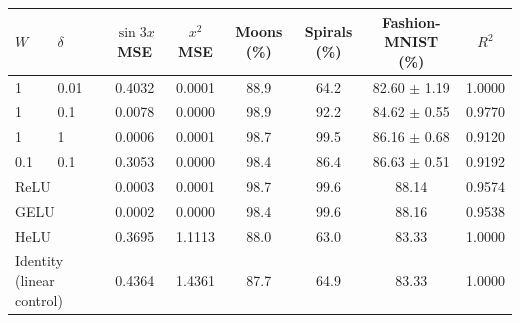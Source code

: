 \begin{tabular}{llcccccc}
\toprule
$W$ & $\delta$ & $\sin 3x$ MSE & $x^2$ MSE & Moons (\%) & Spirals (\%) & Fashion-MNIST (\%) & $R^2$ \\
\midrule
1 & 0.01 & 0.4032 & 0.0001 & 88.9 & 64.2 & 82.60 $\pm$ 1.19 & 1.0000 \\
1 & 0.1 & 0.0078 & 0.0000 & 98.9 & 92.2 & 84.62 $\pm$ 0.55 & 0.9770 \\
1 & 1 & 0.0006 & 0.0001 & 98.7 & 99.5 & 86.16 $\pm$ 0.68 & 0.9120 \\
0.1 & 0.1 & 0.3053 & 0.0000 & 98.4 & 86.4 & 86.63 $\pm$ 0.51 & 0.9192 \\
\midrule
\multicolumn{2}{l}{ReLU} & 0.0003 & 0.0001 & 98.7 & 99.6 & 88.14 & 0.9574 \\
\multicolumn{2}{l}{GELU} & 0.0002 & 0.0000 & 98.4 & 99.6 & 88.16 & 0.9538 \\
\multicolumn{2}{l}{HeLU} & 0.3695 & 1.1113 & 88.0 & 63.0 & 83.33 & 1.0000 \\
\multicolumn{2}{l}{Identity (linear control)} & 0.4364 & 1.4361 & 87.7 & 64.9 & 83.33 & 1.0000 \\
\bottomrule
\end{tabular}
